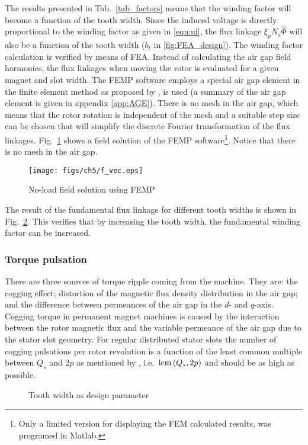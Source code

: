 The results presented in Tab.~\ref{tab_factors} means that the winding factor will become a function of the tooth width. Since the induced voltage is directly proportional to the winding factor as given in \eqref{eqn:ui}, the flux linkage $\xi_p N_s \hat{\Phi}$ will also be a function of the tooth width ($b_t$ in \ref{fig:FEA_design}). The winding factor calculation is verified by means of FEA. Instead of calculating the air gap field harmonics, the flux linkages when moving the rotor is evaluated for a given magnet and slot width. The FEMP software employs a special air gap element in the finite element method as proposed by \cite{razek_1981}, is used (a summary of the air gap element is given in appendix \ref{app:AGE}). There is no mesh in the air gap, which means that the rotor rotation is independent of the mesh and a suitable step size can be chosen that will simplify the discrete Fourier transformation of the flux linkages. Fig.~\ref{fig:fieldsol} shows a field solution of the FEMP software\footnote{Only a limited version for displaying the FEM calculated results, was programed in Matlab.}. Notice that there is no mesh in the air gap.  
\begin{figure}[htbp]
  \centering
    \texttt{[image: figs/ch5/f\_vec.eps]}
    \caption{No-load field solution using FEMP}
  \label{fig:fieldsol}
\end{figure}

The result of the fundamental flux linkage for different tooth widths is shown in Fig.~\ref{fig:Main_bt_design}. This verifies that by increasing the tooth width, the fundamental winding factor can be increased.

\subsubsection{Torque pulsation}\label{subsubsec:torque_pulsations}
There are three sources of torque ripple coming from the machine. They are: the cogging effect; distortion of the magnetic flux density distribution in the air gap; and the difference between permeances of the air gap in the $d$- and $q$-axis. Cogging torque in permanent magnet machines is caused by the interaction between the rotor magnetic flux and the variable permeance of the air gap due to the stator slot geometry. For regular distributed stator slots the number of cogging pulsations per rotor revolution is a function of the least common multiple between $Q_{s}$ and $2p$ as mentioned by \cite{cros_2002}, i.e.~$\textnormal{lcm}\left(Q_{s},2p\right)$ and should be as high as possible.
\begin{figure}[htbp]
  \centering
  
  
  \caption{Tooth width as design parameter}
  \label{fig:Main_bt_design}
\end{figure}

